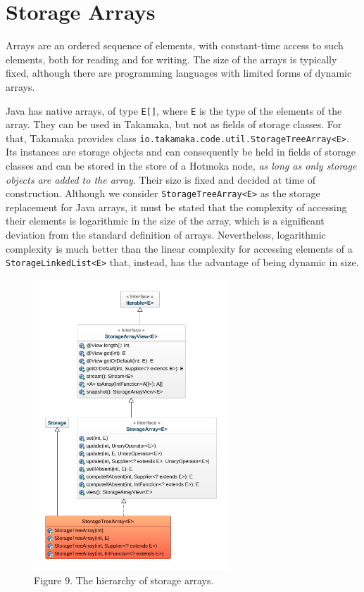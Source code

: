 \documentclass[a4paper,]{book}
\begin{document}
{\hypertarget{storage-arrays}{%
\section{Storage Arrays }\label{storage-arrays}}

Arrays are an ordered sequence of elements, with constant-time access to
such elements, both for reading and for writing. The size of the arrays
is typically fixed, although there are programming languages with
limited forms of dynamic arrays.

Java has native arrays, of type \texttt{E{[}{]}}, where \texttt{E} is
the type of the elements of the array. They can be used in Takamaka, but
not as fields of storage classes. For that, Takamaka provides class
\texttt{io.takamaka.code.util.StorageTreeArray\textless{}E\textgreater{}}.
Its instances are storage objects and can consequently be held in fields
of storage classes and can be stored in the store of a Hotmoka node,
\emph{as long as only storage objects are added to the array}. Their
size is fixed and decided at time of construction. Although we consider
\texttt{StorageTreeArray\textless{}E\textgreater{}} as the storage
replacement for Java arrays, it must be stated that the complexity of
accessing their elements is logarithmic in the size of the array, which
is a significant deviation from the standard definition of arrays.
Nevertheless, logarithmic complexity is much better than the linear
complexity for accessing elements of a
\texttt{StorageLinkedList\textless{}E\textgreater{}} that, instead, has
the advantage of being dynamic in size.

\begin{figure}
\centering
\includegraphics[width=0.65\textwidth,height=\textheight]{pics/arrays.png}
\caption{Figure 9. The hierarchy of storage arrays.}
\end{figure}

}
\end{document}
